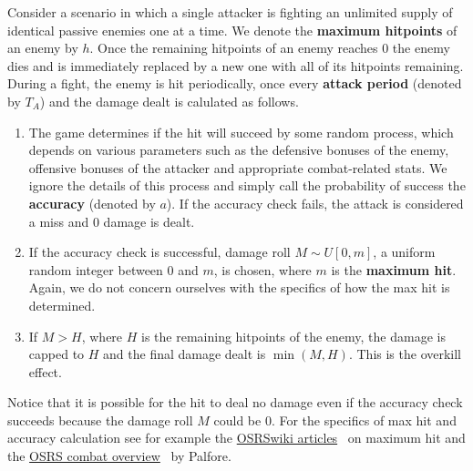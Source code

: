 Consider a scenario in which a single attacker is fighting an unlimited supply of identical passive enemies one at a time. We denote the \textbf{maximum hitpoints} of an enemy by $h$. Once the remaining hitpoints of an enemy reaches 0 the enemy dies and is immediately replaced by a new one with all of its hitpoints remaining. During a fight, the enemy is hit periodically, once every \textbf{attack period} (denoted by $T_A$) and the damage dealt is calulated as follows.
\begin{enumerate}
	\item The game determines if the hit will succeed by some random process, which depends on various parameters such as the defensive bonuses of the enemy, offensive bonuses of the attacker and appropriate combat-related stats. We ignore the details of this process and simply call the probability of success the \textbf{accuracy} (denoted by $a$). If the accuracy check fails, the attack is considered a miss and 0 damage is dealt.
	\item If the accuracy check is successful, damage roll $M\sim U[0,m]$, a uniform random integer between 0 and $m$, is chosen, where $m$ is the \textbf{maximum hit}. Again, we do not concern ourselves with the specifics of how the max hit is determined.
    \item If $M > H$, where $H$ is the remaining hitpoints of the enemy, the damage is capped to $H$ and the final damage dealt is $\min(M,H)$. This is the overkill effect.
\end{enumerate}
Notice that it is possible for the hit to deal no damage even if the accuracy check succeeds because the damage roll $M$ could be 0. For the specifics of max hit and accuracy calculation see for example the \href{https://oldschool.runescape.wiki/w/Maximum_hit}{OSRSwiki articles}~\cite{wiki} on maximum hit and the \href{https://github.com/Palfore/OSRSmath}{OSRS combat overview}~\cite{palfore} by Palfore.
